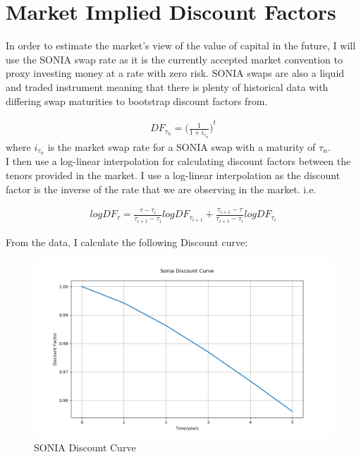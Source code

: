 \documentclass{report}
\theoremstyle{plain}
\theoremstyle{definition}
\begin{document}
\chapter{Market Implied Discount Factors}

In order to estimate the market's view of the value of capital in the future, I will use the SONIA swap rate as it is the currently accepted market convention to proxy investing money at a rate with zero risk. SONIA swaps are also a liquid and traded instrument meaning that there is plenty of historical data with differing swap maturities to bootstrap discount factors from.

\begin{align*}
DF_{\tau_n} = {\Big(\frac{1}{1+i_{\tau_n}}\Big)}^{t}
\end{align*}
where $i_{\tau_n}$ is the market swap rate for a SONIA swap with a maturity of $\tau_n$.\\

I then use a log-linear interpolation for calculating discount factors between the tenors provided in the market. I use a log-linear interpolation as the discount factor is the inverse of the rate that we are observing in the market. i.e.

\begin{align*}
logDF_{\tau} = \frac{\tau - \tau_i}{\tau_{i+1} - \tau_{i}}logDF_{\tau_{i+1}} + \frac{\tau_{i+1} - \tau}{\tau_{i+1} - \tau_{i}}logDF_{\tau_{i}}
\end{align*}

From the data, I calculate the following Discount curve:

\begin{figure}[H]
	\begin{center}
		\includegraphics[width=15cm]{Sonia_Discount_Curve.png}
		\caption{SONIA Discount Curve} 
		\label{Sonia_Discount_Curve}
	\end{center}
\end{figure}
\end{document}
